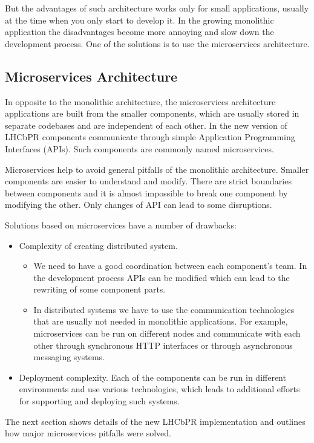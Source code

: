 \documentclass[a4paper]{jpconf}
\begin{document}
But the advantages of such architecture works only for small applications,
usually at the time when you only start to develop it. In the growing
monolithic application the disadvantages become more annoying and slow down the
development process. One of the solutions is to use the microservices architecture.  

\subsection{Microservices Architecture}

In opposite to the monolithic architecture, the microservices architecture
applications are built from the smaller components, which are usually  stored
in separate codebases and are independent of each other. In the new version of LHCbPR
components communicate through simple Application Programming
Interfaces (APIs). Such components are commonly named microservices.

Microservices help to avoid general pitfalls of the monolithic architecture.
Smaller components are easier to understand and modify. There are strict boundaries
between components and it is almost impossible to break one component by modifying
the other. Only changes of API can lead to some  disruptions.   

Solutions based on microservices have a number of drawbacks:
\begin{itemize}
\item Complexity of creating distributed system.
\begin{itemize}
\item We need to have a good coordination between  each component's team. In 
the development process APIs can be modified which can lead to the rewriting of
some component parts. 
\item In distributed systems we have to use the communication technologies that
are usually not needed in monolithic applications. For example, microservices can be
run on different nodes and communicate with each other through synchronous HTTP
interfaces or through asynchronous messaging systems.  
\end{itemize}
\item Deployment complexity.  Each of the components can be run in  different
environments and use various technologies, which leads to additional efforts for
supporting and deploying such systems.
\end{itemize}

The next section shows details of the new LHCbPR implementation and outlines how
major microservices pitfalls were solved.
\end{document}
